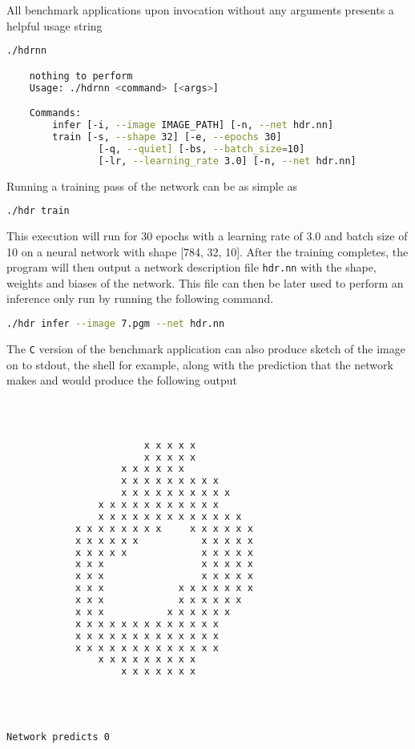 All benchmark applications upon invocation without any arguments presents a helpful usage string

\begin{lstlisting}[language=Bash]
	./hdrnn

	nothing to perform
	Usage: ./hdrnn <command> [<args>]

	Commands:
		infer [-i, --image IMAGE_PATH] [-n, --net hdr.nn]
		train [-s, --shape 32] [-e, --epochs 30]
				[-q, --quiet] [-bs, --batch_size=10]
				[-lr, --learning_rate 3.0] [-n, --net hdr.nn]
\end{lstlisting}

Running a training pass of the network can be as simple as

\begin{lstlisting}[language=Bash]
	./hdr train
\end{lstlisting}

This execution will run for 30 epochs with a learning rate of 3.0 and batch size of 10 on a neural network with shape [784, 32, 10]. After the training completes, the program will then output a network description file \texttt{hdr.nn} with the shape, weights and biases of the network. This file can then be later used to perform an inference only run by running the following command.

\begin{lstlisting}[language=Bash]
	./hdr infer --image 7.pgm --net hdr.nn
\end{lstlisting}

The \texttt{C} version of the benchmark application can also produce sketch of the image on to stdout, the shell for example, along with the prediction that the network makes and would produce the following output

\begin{lstlisting}[language=Bash]



						x x x x x
						x x x x x
					x x x x x x
					x x x x x x x x x
					x x x x x x x x x x
				x x x x x x x x x x x
				x x x x x x x x x x x x x
			x x x x x x x x     x x x x x x
			x x x x x x           x x x x x
			x x x x x             x x x x x
			x x x                 x x x x x
			x x x                 x x x x x
			x x x             x x x x x x x
			x x x             x x x x x x
			x x x           x x x x x x
			x x x x x x x x x x x x x
			x x x x x x x x x x x x x
			x x x x x x x x x x x x x
				x x x x x x x x x
					x x x x x x x




Network predicts 0
\end{lstlisting}

